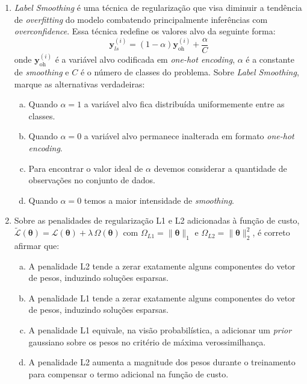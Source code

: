 \documentclass{dlproblemset}
\begin{document}
\begin{enumerate}[1)]
    \item \textit{Label Smoothing} é uma técnica de regularização que visa diminuir a tendência de \textit{overfitting} do modelo combatendo principalmente inferências com \textit{overconfidence}. Essa técnica redefine os valores alvo da seguinte forma:
    \begin{equation*}
     \mathbf{y}^{(i)}_{ls} = (1 - \alpha)\mathbf{y}^{(i)}_{\text{oh}} + \frac{\alpha}{C}
    \end{equation*}
    \noindent onde $\mathbf{y}^{(i)}_{\text{oh}}$ é a variável alvo codificada em \textit{one-hot encoding}, $\alpha$ é a constante de \textit{smoothing} e $C$ é o número de classes do problema. Sobre \textit{Label Smoothing}, marque as alternativas verdadeiras:

    \begin{enumerate}[(a)]
	    \item Quando $\alpha=1$ a variável alvo fica distribuída uniformemente entre as classes.
	    \item Quando $\alpha=0$ a variável alvo permanece inalterada em formato \textit{one-hot encoding}.
	    \item Para encontrar o valor ideal de $\alpha$ devemos considerar a quantidade de observações no conjunto de dados.
	    \item Quando $\alpha=0$ temos a maior intensidade de \textit{smoothing}.
    \end{enumerate}

    \item Sobre as penalidades de regularização L1 e L2 adicionadas à função de custo, $\tilde{\mathcal{L}}(\boldsymbol{\theta}) = \mathcal{L}(\boldsymbol{\theta}) + \lambda\,\Omega(\boldsymbol{\theta})$ com $\Omega_{L1} = \|\boldsymbol{\theta}\|_1$ e $\Omega_{L2} = \|\boldsymbol{\theta}\|_2^2$, é correto afirmar que:
    \begin{enumerate}[(a)]
        \item A penalidade L2 tende a zerar exatamente alguns componentes do vetor de pesos, induzindo soluções esparsas.
        \item A penalidade L1 tende a zerar exatamente alguns componentes do vetor de pesos, induzindo soluções esparsas.
        \item A penalidade L1 equivale, na visão probabilística, a adicionar um \textit{prior} gaussiano sobre os pesos no critério de máxima verossimilhança.
        \item A penalidade L2 aumenta a magnitude dos pesos durante o treinamento para compensar o termo adicional na função de custo.
    \end{enumerate}


\end{enumerate}
\end{document}

